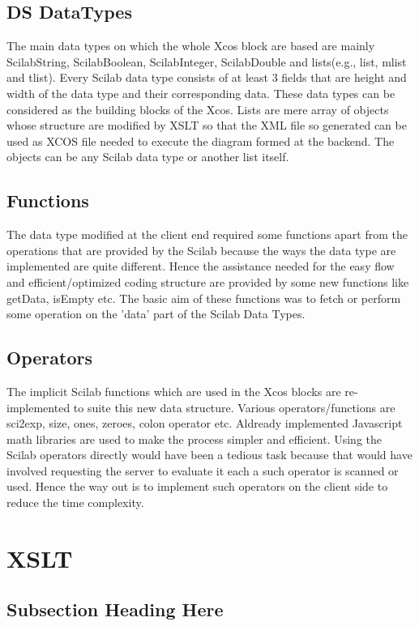\documentclass[conference]{IEEEtran}
\begin{document}
\subsection{DS DataTypes}
The main data types on which the whole Xcos block are based are mainly ScilabString, ScilabBoolean, ScilabInteger, ScilabDouble and lists(e.g., list, mlist and tlist). Every Scilab data type consists of at least 3 fields that are height and width of the data type and their corresponding data. 
These data types can be considered as the building blocks of the Xcos. Lists are mere array of objects whose structure are modified by XSLT so that the XML file so generated can be used as XCOS file needed to execute the diagram formed at the backend. The objects can be any Scilab data type or another list itself.

\subsection{Functions}
The data type modified at the client end required some functions apart from the operations that are provided by the Scilab because the ways the data type are implemented are quite different. Hence the assistance needed for the easy flow and efficient/optimized coding structure are provided by some new functions like getData, isEmpty etc. The basic aim of these functions was to fetch or perform some operation on the 'data' part of the Scilab Data Types.

\subsection{Operators}
The implicit Scilab functions which are used in the Xcos blocks are re-implemented to suite this new data structure. Various operators/functions are sci2exp, size, ones, zeroes, colon operator etc. Aldready implemented Javascript math libraries are used to make the process simpler and efficient. Using the Scilab operators directly would have been a tedious task because that would have involved requesting the server to evaluate it each a such operator is scanned or used. Hence the way out is to implement such operators on the client side to reduce the time complexity.


\section{XSLT}
\blindtext

\subsection{Subsection Heading Here}
\blindtext
\end{document}
